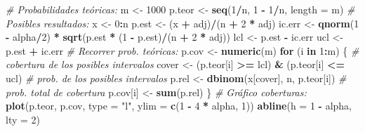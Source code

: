 \documentclass[
]{book}
\newenvironment{Shaded}{\begin{snugshade}}{\end{snugshade}}
\newcommand{\CommentTok}[1]{\textcolor[rgb]{0.56,0.35,0.01}{\textit{#1}}}
\newcommand{\ControlFlowTok}[1]{\textcolor[rgb]{0.13,0.29,0.53}{\textbf{#1}}}
\newcommand{\DataTypeTok}[1]{\textcolor[rgb]{0.13,0.29,0.53}{#1}}
\newcommand{\DecValTok}[1]{\textcolor[rgb]{0.00,0.00,0.81}{#1}}
\newcommand{\KeywordTok}[1]{\textcolor[rgb]{0.13,0.29,0.53}{\textbf{#1}}}
\newcommand{\NormalTok}[1]{#1}
\newcommand{\OperatorTok}[1]{\textcolor[rgb]{0.81,0.36,0.00}{\textbf{#1}}}
\newcommand{\StringTok}[1]{\textcolor[rgb]{0.31,0.60,0.02}{#1}}
\theoremstyle{break}
\theoremstyle{definition}
\theoremstyle{definition}
\theoremstyle{definition}
\theoremstyle{remark}
\begin{document}
\begin{enumerate}
\begin{Shaded}
\begin{Highlighting}[]
\CommentTok{# Probabilidades teóricas:}
\NormalTok{m <-}\StringTok{ }\DecValTok{1000}
\NormalTok{p.teor <-}\StringTok{ }\KeywordTok{seq}\NormalTok{(}\DecValTok{1}\OperatorTok{/}\NormalTok{n, }\DecValTok{1} \OperatorTok{-}\StringTok{ }\DecValTok{1}\OperatorTok{/}\NormalTok{n, }\DataTypeTok{length =}\NormalTok{ m) }
\CommentTok{# Posibles resultados:}
\NormalTok{x <-}\StringTok{ }\DecValTok{0}\OperatorTok{:}\NormalTok{n}
\NormalTok{p.est <-}\StringTok{ }\NormalTok{(x }\OperatorTok{+}\StringTok{ }\NormalTok{adj)}\OperatorTok{/}\NormalTok{(n }\OperatorTok{+}\StringTok{ }\DecValTok{2} \OperatorTok{*}\StringTok{ }\NormalTok{adj) }
\NormalTok{ic.err <-}\StringTok{ }\KeywordTok{qnorm}\NormalTok{(}\DecValTok{1} \OperatorTok{-}\StringTok{ }\NormalTok{alpha}\OperatorTok{/}\DecValTok{2}\NormalTok{) }\OperatorTok{*}\StringTok{ }\KeywordTok{sqrt}\NormalTok{(p.est }\OperatorTok{*}\StringTok{ }\NormalTok{(}\DecValTok{1} \OperatorTok{-}\StringTok{ }\NormalTok{p.est)}\OperatorTok{/}\NormalTok{(n }\OperatorTok{+}\StringTok{ }\DecValTok{2} \OperatorTok{*}\StringTok{ }\NormalTok{adj))  }
\NormalTok{lcl <-}\StringTok{ }\NormalTok{p.est }\OperatorTok{-}\StringTok{ }\NormalTok{ic.err }
\NormalTok{ucl <-}\StringTok{ }\NormalTok{p.est }\OperatorTok{+}\StringTok{ }\NormalTok{ic.err }
\CommentTok{# Recorrer prob. teóricas:}
\NormalTok{p.cov <-}\StringTok{ }\KeywordTok{numeric}\NormalTok{(m)}
\ControlFlowTok{for}\NormalTok{ (i }\ControlFlowTok{in} \DecValTok{1}\OperatorTok{:}\NormalTok{m) \{}
  \CommentTok{# cobertura de los posibles intervalos}
\NormalTok{  cover <-}\StringTok{ }\NormalTok{(p.teor[i] }\OperatorTok{>=}\StringTok{ }\NormalTok{lcl) }\OperatorTok{&}\StringTok{ }\NormalTok{(p.teor[i] }\OperatorTok{<=}\StringTok{ }\NormalTok{ucl)  }
  \CommentTok{# prob. de los posibles intervalos}
\NormalTok{  p.rel <-}\StringTok{ }\KeywordTok{dbinom}\NormalTok{(x[cover], n, p.teor[i])           }
  \CommentTok{# prob. total de cobertura}
\NormalTok{  p.cov[i] <-}\StringTok{ }\KeywordTok{sum}\NormalTok{(p.rel)                            }
\NormalTok{\}}
\CommentTok{# Gráfico coberturas:}
\KeywordTok{plot}\NormalTok{(p.teor, p.cov, }\DataTypeTok{type =} \StringTok{"l"}\NormalTok{, }\DataTypeTok{ylim =} \KeywordTok{c}\NormalTok{(}\DecValTok{1} \OperatorTok{-}\StringTok{ }\DecValTok{4} \OperatorTok{*}\StringTok{ }\NormalTok{alpha, }\DecValTok{1}\NormalTok{))}
\KeywordTok{abline}\NormalTok{(}\DataTypeTok{h =} \DecValTok{1} \OperatorTok{-}\StringTok{ }\NormalTok{alpha, }\DataTypeTok{lty =} \DecValTok{2}\NormalTok{) }
\end{Highlighting}
\end{Shaded}


\end{enumerate}
\end{document}
